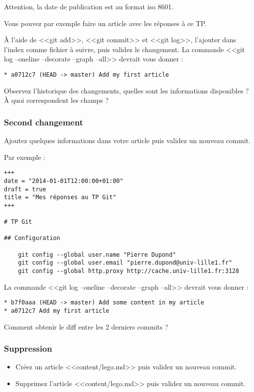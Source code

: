 \documentclass[a4paper]{article}
\begin{document}
Attention, la date de publication est au format iso 8601.

Vous pouvez par exemple faire un article avec les réponses à ce TP.

À l'aide de <<git add>>, <<git commit>> et <<git log>>, l'ajouter dans l'index comme fichier à suivre, puis validez le changement. 
La commande <<git log --oneline --decorate --graph --all>> devrait vous donner :
\begin{verbatim}
* a0712c7 (HEAD -> master) Add my first article
\end{verbatim}

Observez l'historique des changements, quelles sont les informations disponibles ? À quoi correspondent les champs ?

\subsubsection{Second changement}
Ajoutez quelques informations dans votre article puis validez un nouveau commit.

Par exemple : 
\begin{verbatim}
+++
date = "2014-01-01T12:00:00+01:00"
draft = true
title = "Mes réponses au TP Git"
+++

# TP Git

## Configuration

    git config --global user.name "Pierre Dupond"
    git config --global user.email "pierre.dupond@univ-lille1.fr"
    git config --global http.proxy http://cache.univ-lille1.fr:3128

\end{verbatim}

La commande <<git log --oneline --decorate --graph --all>> devrait vous donner :
\begin{verbatim}
* b7f0aaa (HEAD -> master) Add some content in my article
* a0712c7 Add my first article
\end{verbatim}

Comment obtenir le diff entre les 2 derniers commits ?

\subsubsection{Suppression}
\begin{itemize}
\item Créez un article <<content/lego.md>> puis validez un nouveau commit. 
\item Supprimez l'article <<content/lego.md>> puis validez un nouveau commit. 
\end{itemize}
\end{document}
